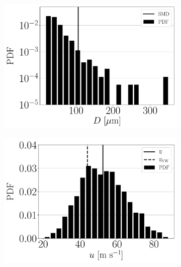 \begin{figure}[h!]
\centering
\begin{subfigure}[b]{0.3\textwidth}
	\centering
   \includegraphics[scale=0.24]{./part2_developments/figures_ch5_resolved_JICF/injectors_SLI_extra/uG100_dx10_x05_size_histogram}
\end{subfigure}
   \hspace{0.17in}
\begin{subfigure}[b]{0.3\textwidth}
	\centering
   \includegraphics[scale=0.24]{./part2_developments/figures_ch5_resolved_JICF/injectors_SLI_extra/uG100_dx10_x05_vel_histogram}
\end{subfigure}
   \hspace{0.17in}

\end{figure}
